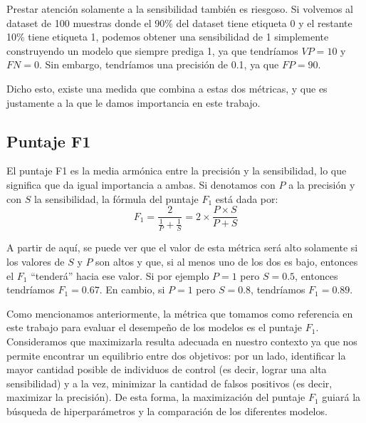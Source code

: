 \documentclass[../../main.tex]{subfiles}
\begin{document}
Prestar atención solamente a la sensibilidad también es riesgoso. Si volvemos al dataset
de 100 muestras donde el 90\% del dataset tiene etiqueta 0 y el restante 10\% tiene
etiqueta 1, podemos obtener una sensibilidad de 1 simplemente construyendo un modelo que
siempre prediga 1, ya que tendríamos \(VP=10\) y \(FN=0\). Sin embargo, tendríamos
una precisión de 0.1, ya que \(FP=90\).

Dicho esto, existe una medida que combina a estas dos métricas, y que es justamente
a la que le damos importancia en este trabajo.

\subsection{Puntaje F1}
El puntaje F1 es la media armónica entre la precisión y la sensibilidad, lo que significa
que da igual importancia a ambas. Si denotamos con \(P\) a la precisión y con \(S\) la
sensibilidad, la fórmula del puntaje \(F_1\) está dada por:
\[
    F_1 = \frac{2}{\frac{1}{P} + \frac{1}{S}} = 2 \times \frac{P \times S}{P + S}
\]

A partir de aquí, se puede ver que el valor de esta métrica será alto solamente si los
valores de \(S\) y \(P\) son altos y que, si al menos uno de los dos es bajo, entonces el
\(F_1\) ``tenderá'' hacia ese valor. Si por ejemplo \(P=1\) pero \(S=0.5\), entonces
tendríamos \(F_1 = 0.67\). En cambio, si \(P=1\) pero \(S=0.8\), tendríamos \(F_1 =
0.89\).

\bigskip
Como mencionamos anteriormente, la métrica que tomamos como referencia en este trabajo
para evaluar el desempeño de los modelos es el puntaje \(F_1\). Consideramos que
maximizarla resulta  adecuada en nuestro contexto ya que nos permite encontrar un
equilibrio entre dos objetivos: por un lado, identificar la mayor cantidad posible de
individuos de control (es decir, lograr una alta sensibilidad) y a la vez, minimizar la
cantidad de falsos positivos (es decir, maximizar la precisión). De esta forma, la
maximización del puntaje \(F_1\) guiará la búsqueda de hiperparámetros y la comparación de
los diferentes modelos.
\end{document}
